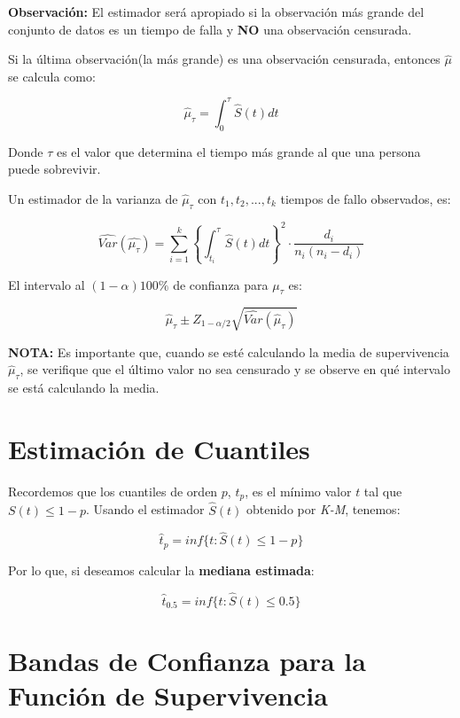\documentclass[
  a4paper,
  oneside,
  openany]{book}
\begin{document}
\textbf{Observación:} El estimador será apropiado si la observación más grande del conjunto de datos es un tiempo de falla y \textbf{NO} una observación censurada.

Si la última observación(la más grande) es una observación censurada, entonces \(\hat{\mu}\) se calcula como:

\[
\hat{\mu}_{\tau} =\int_{0}^{\tau}\hat{S}(t)dt
\]

Donde \(\tau\) es el valor que determina el tiempo más grande al que una persona puede sobrevivir.

Un estimador de la varianza de \(\hat{\mu}_{\tau}\) con \(t_{1}, t_{2},...,t_{k}\) tiempos de fallo observados, es:

\[
\hat{Var}(\hat{\mu_\tau}) = \sum_{i = 1}^{k}\left\{\int_{t_i}^{\tau}\hat{S}(t)dt\right\}^2 \cdot \frac{d_{i}}{n_{i}(n_{i}-d_{i})}
\]

El intervalo al \((1-\alpha)100\%\) de confianza para \(\mu_\tau\) es:

\[
\hat\mu_{\tau} \pm Z_{1-\alpha/2}\sqrt{\hat{Var}(\hat\mu_\tau)}
\]

\textbf{NOTA:} Es importante que, cuando se esté calculando la media de supervivencia \(\hat\mu_{\tau}\), se verifique que el último valor no sea censurado y se observe en qué intervalo se está calculando la media.

\hypertarget{estimaciuxf3n-de-cuantiles}{%
\section{Estimación de Cuantiles}\label{estimaciuxf3n-de-cuantiles}}

Recordemos que los cuantiles de orden \(p\), \(t_p\), es el mínimo valor \(t\) tal que \(S(t)\leq 1-p\). Usando el estimador \(\hat{S}(t)\) obtenido por \emph{K-M}, tenemos:

\[
\hat{t}_p = inf\{t:\hat{S}(t)\leq 1-p\}
\]

Por lo que, si deseamos calcular la \textbf{mediana estimada}:

\[
\hat{t}_{0.5} = inf\{t:\hat{S}(t)\leq 0.5\}
\]

\hypertarget{bandas-de-confianza-para-la-funciuxf3n-de-supervivencia}{%
\section{Bandas de Confianza para la Función de Supervivencia}\label{bandas-de-confianza-para-la-funciuxf3n-de-supervivencia}}
\end{document}

